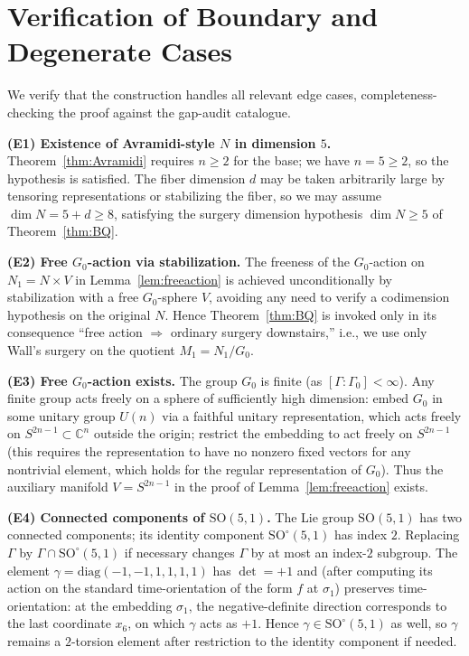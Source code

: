 \documentclass[12pt]{article}
\theoremstyle{definition}
\begin{document}
\section{Verification of Boundary and Degenerate Cases}\label{sec:edge}

We verify that the construction handles all relevant edge cases, completeness-checking the proof against the gap-audit catalogue.

\medskip

\noindent\textbf{(E1) Existence of Avramidi-style $N$ in dimension $5$.} Theorem~\ref{thm:Avramidi} requires $n\geq 2$ for the base; we have $n=5\geq 2$, so the hypothesis is satisfied. The fiber dimension $d$ may be taken arbitrarily large by tensoring representations or stabilizing the fiber, so we may assume $\dim N = 5+d \geq 8$, satisfying the surgery dimension hypothesis $\dim N\geq 5$ of Theorem~\ref{thm:BQ}.

\medskip

\noindent\textbf{(E2) Free $G_0$-action via stabilization.} The freeness of the $G_0$-action on $N_1=N\times V$ in Lemma~\ref{lem:freeaction} is achieved unconditionally by stabilization with a free $G_0$-sphere $V$, avoiding any need to verify a codimension hypothesis on the original $N$. Hence Theorem~\ref{thm:BQ} is invoked only in its consequence ``free action $\Rightarrow$ ordinary surgery downstairs,'' i.e., we use only Wall's surgery on the quotient $M_1=N_1/G_0$.

\medskip

\noindent\textbf{(E3) Free $G_0$-action exists.} The group $G_0$ is finite (as $[\Gamma:\Gamma_0]<\infty$). Any finite group acts freely on a sphere of sufficiently high dimension: embed $G_0$ in some unitary group $U(n)$ via a faithful unitary representation, which acts freely on $S^{2n-1}\subset\mathbb{C}^n$ outside the origin; restrict the embedding to act freely on $S^{2n-1}$ (this requires the representation to have no nonzero fixed vectors for any nontrivial element, which holds for the regular representation of $G_0$). Thus the auxiliary manifold $V=S^{2n-1}$ in the proof of Lemma~\ref{lem:freeaction} exists.

\medskip

\noindent\textbf{(E4) Connected components of $\mathrm{SO}(5,1)$.} The Lie group $\mathrm{SO}(5,1)$ has two connected components; its identity component $\mathrm{SO}^\circ(5,1)$ has index $2$. Replacing $\Gamma$ by $\Gamma\cap\mathrm{SO}^\circ(5,1)$ if necessary changes $\Gamma$ by at most an index-$2$ subgroup. The element $\gamma=\mathrm{diag}(-1,-1,1,1,1,1)$ has $\det=+1$ and (after computing its action on the standard time-orientation of the form $f$ at $\sigma_1$) preserves time-orientation: at the embedding $\sigma_1$, the negative-definite direction corresponds to the last coordinate $x_6$, on which $\gamma$ acts as $+1$. Hence $\gamma\in\mathrm{SO}^\circ(5,1)$ as well, so $\gamma$ remains a $2$-torsion element after restriction to the identity component if needed.
\end{document}
